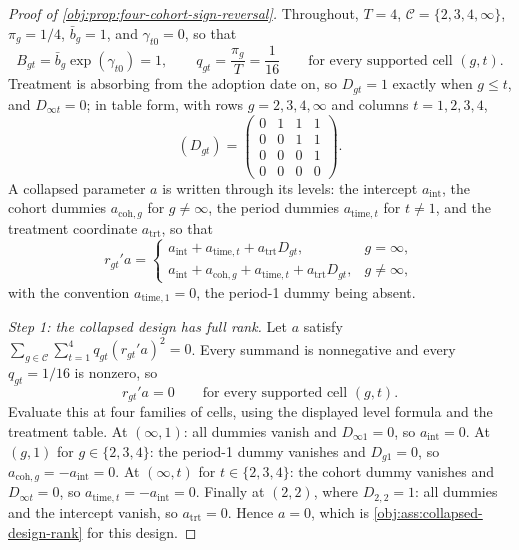 \documentclass[11pt]{article}
\begin{document}
\begin{proof}[Proof of \cref{obj:prop:four-cohort-sign-reversal}]
Throughout, \(T=4\), \(\mathcal C=\{2,3,4,\infty\}\), \(\pi_g=1/4\), \(\bar b_g=1\), and \(\gamma_{t0}=0\), so that
\[
B_{gt}=\bar b_g\exp(\gamma_{t0})=1,
\qquad
q_{gt}=\frac{\pi_g}{T}=\frac{1}{16}
\qquad\text{for every supported cell }(g,t).
\]
Treatment is absorbing from the adoption date on, so \(D_{gt}=1\) exactly when \(g\le t\), and \(D_{\infty t}=0\); in table form, with rows \(g=2,3,4,\infty\) and columns \(t=1,2,3,4\),
\[
(D_{gt})=
\begin{pmatrix}
0&1&1&1\\
0&0&1&1\\
0&0&0&1\\
0&0&0&0
\end{pmatrix}.
\]
A collapsed parameter \(a\) is written through its levels: the intercept \(a_{\text{int}}\), the cohort dummies \(a_{\text{coh},g}\) for \(g\neq\infty\), the period dummies \(a_{\text{time},t}\) for \(t\neq1\), and the treatment coordinate \(a_{\text{trt}}\), so that
\[
r_{gt}'a
=
\begin{cases}
a_{\text{int}}+a_{\text{time},t}+a_{\text{trt}}D_{gt}, & g=\infty,\\
a_{\text{int}}+a_{\text{coh},g}+a_{\text{time},t}+a_{\text{trt}}D_{gt}, & g\neq\infty,
\end{cases}
\]
with the convention \(a_{\text{time},1}=0\), the period-1 dummy being absent.

\textit{Step 1: the collapsed design has full rank.} Let \(a\) satisfy \(\sum_{g\in\mathcal C}\sum_{t=1}^4 q_{gt}(r_{gt}'a)^2=0\). Every summand is nonnegative and every \(q_{gt}=1/16\) is nonzero, so
\[
r_{gt}'a=0
\qquad\text{for every supported cell }(g,t).
\]
Evaluate this at four families of cells, using the displayed level formula and the treatment table. At \((\infty,1)\): all dummies vanish and \(D_{\infty1}=0\), so \(a_{\text{int}}=0\). At \((g,1)\) for \(g\in\{2,3,4\}\): the period-1 dummy vanishes and \(D_{g1}=0\), so \(a_{\text{coh},g}=-a_{\text{int}}=0\). At \((\infty,t)\) for \(t\in\{2,3,4\}\): the cohort dummy vanishes and \(D_{\infty t}=0\), so \(a_{\text{time},t}=-a_{\text{int}}=0\). Finally at \((2,2)\), where \(D_{2,2}=1\): all dummies and the intercept vanish, so \(a_{\text{trt}}=0\). Hence \(a=0\), which is \cref{obj:ass:collapsed-design-rank} for this design.


\end{proof}
\end{document}
